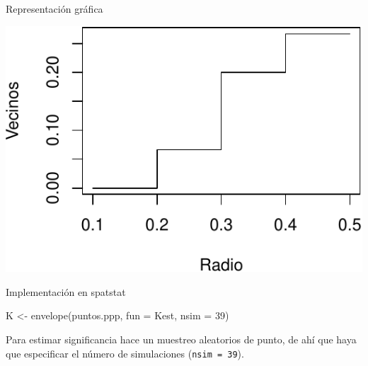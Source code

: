 \documentclass[
  11pt,
  ignorenonframetext,
]{beamer}
\newenvironment{Shaded}{}{}
\newcommand{\AttributeTok}[1]{\textcolor[rgb]{0.49,0.56,0.16}{#1}}
\newcommand{\DecValTok}[1]{\textcolor[rgb]{0.25,0.63,0.44}{#1}}
\newcommand{\FunctionTok}[1]{\textcolor[rgb]{0.02,0.16,0.49}{#1}}
\newcommand{\NormalTok}[1]{#1}
\newcommand{\OtherTok}[1]{\textcolor[rgb]{0.00,0.44,0.13}{#1}}
\begin{document}
\begin{frame}{Representación gráfica}
\protect\hypertarget{representaciuxf3n-gruxe1fica}{}
\begin{center}\includegraphics{Tutorial-spatstat-2_files/figure-beamer/unnamed-chunk-8-1} \end{center}
\end{frame}

\begin{frame}[fragile]{Implementación en spatstat}
\protect\hypertarget{implementaciuxf3n-en-spatstat}{}
\begin{Shaded}
\begin{Highlighting}[]
\NormalTok{K }\OtherTok{\textless{}{-}} \FunctionTok{envelope}\NormalTok{(puntos.ppp, }\AttributeTok{fun =}\NormalTok{ Kest, }\AttributeTok{nsim =} \DecValTok{39}\NormalTok{)}
\end{Highlighting}
\end{Shaded}

Para estimar significancia hace un muestreo aleatorios de punto, de ahí
que haya que especificar el número de simulaciones
(\texttt{nsim\ =\ 39}).
\end{frame}
\end{document}
